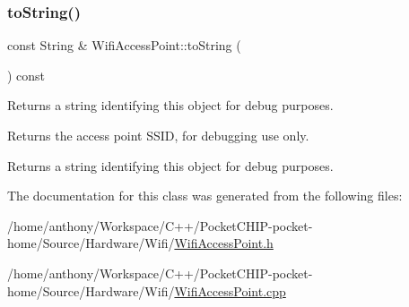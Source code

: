 \subsubsection{\texorpdfstring{to\+String()}{toString()}}
{\footnotesize\ttfamily const String \& Wifi\+Access\+Point\+::to\+String (\begin{DoxyParamCaption}{ }\end{DoxyParamCaption}) const}

Returns a string identifying this object for debug purposes.

\begin{DoxyReturn}{Returns}
the access point S\+S\+ID, for debugging use only.
\end{DoxyReturn}
Returns a string identifying this object for debug purposes. 

The documentation for this class was generated from the following files\+:\begin{DoxyCompactItemize}
\item 
/home/anthony/\+Workspace/\+C++/\+Pocket\+C\+H\+I\+P-\/pocket-\/home/\+Source/\+Hardware/\+Wifi/\mbox{\hyperlink{WifiAccessPoint_8h}{Wifi\+Access\+Point.\+h}}\item 
/home/anthony/\+Workspace/\+C++/\+Pocket\+C\+H\+I\+P-\/pocket-\/home/\+Source/\+Hardware/\+Wifi/\mbox{\hyperlink{WifiAccessPoint_8cpp}{Wifi\+Access\+Point.\+cpp}}\end{DoxyCompactItemize}
